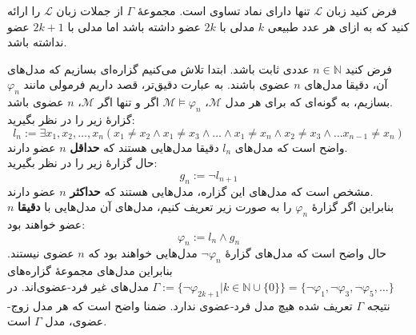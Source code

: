 فرض کنید زبان
$\mathcal{L}$
تنها دارای نماد تساوی است. مجموعهٔ $\Gamma$ از جملات زبان $\mathcal{L}$ را ارائه کنید که به ازای هر عدد طبیعی $k$ مدلی با $2k$ عضو داشته باشد اما مدلی با $2k+1$ عضو نداشته باشد.
\begin{ans}
  فرض کنید $n \in \mathbb{N}$ عددی ثابت باشد.
  ابتدا تلاش می‌کنیم گزاره‌ای بسازیم که مدل‌های آن، دقیقا مدل‌های $n$ عضوی باشند. به عبارت دقیق‌تر، قصد داریم فرمولی مانند $\varphi_n$ بسازیم، به گونه‌ای که برای هر مدل $\mathcal{M}$، $\mathcal{M} \models \varphi_n$ اگر و تنها اگر $\mathcal{M}$، $n$ عضوی باشد.\\
  گزارهٔ زیر را در نظر بگیرید:
  $$l_n := \exists x_1,x_2,\dots,x_n (x_1 \neq x_2 \wedge x_1 \neq x_3 \wedge \dots \wedge x_1 \neq x_n \wedge x_2 \neq x_3 \wedge \dots x_{n-1} \neq x_n)$$
  واضح است که مدل‌های $l_n$ دقیقا مدل‌هایی هستند که \textbf{حداقل} $n$ عضو دارند.\\
  حال گزارهٔ زیر را در نظر بگیرید:
  $$g_n := \neg l_{n+1}$$
  مشخص است که مدل‌های این گزاره، مدل‌هایی هستند که \textbf{حداکثر} $n$ عضو دارند.\\
  بنابراین اگر گزارهٔ $\varphi_n$ را به صورت زیر تعریف کنیم، مدل‌های آن مدل‌هایی با \textbf{دقیقا} $n$ عضو خواهند بود:
  $$\varphi_n := l_n \wedge g_n$$
  حال واضح است که مدل‌های گزارهٔ $\neg \varphi_n$ مدل‌هایی خواهند بود که $n$ عضوی نیستند. بنابراین مدل‌های مجموعهٔ گزاره‌های $\Gamma := \{\neg \varphi_{2k+1} | k \in \mathbb{N}\cup\{0\}\} = \{\neg \varphi_1, \neg \varphi_3, \neg \varphi_5, \dots\}$ مدل‌های غیر فرد-عضوی‌اند. در نتیجه $\Gamma$ تعریف شده هیچ مدل فرد-عضوی ندارد. ضمنا واضح است که هر مدل زوج-عضوی، مدل $\Gamma$ است.
\end{ans}
